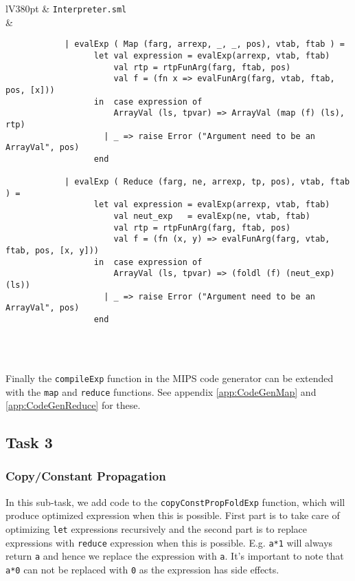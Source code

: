 \documentclass[a4paper]{article}
\begin{document}
\begin{center}	
	\begin{tabular}{lV{380pt}}
		\toprule
		& \verb|Interpreter.sml|\\
		\midrule
		&
		\begin{verbatim}		
			| evalExp ( Map (farg, arrexp, _, _, pos), vtab, ftab ) =
			      let val expression = evalExp(arrexp, vtab, ftab)
			          val rtp = rtpFunArg(farg, ftab, pos)
			          val f = (fn x => evalFunArg(farg, vtab, ftab, pos, [x]))
			      in  case expression of
			          ArrayVal (ls, tpvar) => ArrayVal (map (f) (ls), rtp)
			        | _ => raise Error ("Argument need to be an ArrayVal", pos)
			      end
			
			| evalExp ( Reduce (farg, ne, arrexp, tp, pos), vtab, ftab ) =
			      let val expression = evalExp(arrexp, vtab, ftab)
			          val neut_exp   = evalExp(ne, vtab, ftab)
			          val rtp = rtpFunArg(farg, ftab, pos)
			          val f = (fn (x, y) => evalFunArg(farg, vtab, ftab, pos, [x, y]))
			      in  case expression of
			          ArrayVal (ls, tpvar) => (foldl (f) (neut_exp) (ls))
			        | _ => raise Error ("Argument need to be an ArrayVal", pos)
			      end
		\end{verbatim}
		\\
		\bottomrule \\
	\end{tabular}
\end{center}
	
Finally the \verb|compileExp| function in the MIPS code generator can be extended with the \verb|map| and \verb|reduce| functions. See appendix \ref{app:CodeGenMap} and \ref{app:CodeGenReduce} for these.

\subsection{Task 3}

\subsubsection{Copy/Constant Propagation}

In this sub-task, we add code to the \texttt{copyConstPropFoldExp} function, which will produce optimized expression when this is possible. First part is to take care of optimizing \texttt{let} expressions recursively and the second part is to replace expressions with \texttt{reduce} expression when this is possible.
E.g. \texttt{a*1} will always return \texttt{a} and hence we replace the expression with \texttt{a}. It's important to note that \texttt{a*0} can not be replaced with \texttt{0} as the expression has side effects.
\end{document}
